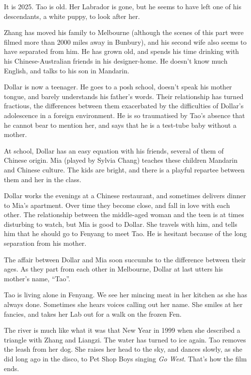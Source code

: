 \documentclass{article}
\begin{document}
It is 2025.  Tao is old.  Her Labrador is gone, but he seems to have
left one of his descendants, a white puppy, to look after her.

Zhang has moved his family to Melbourne (although the scenes of this
part were filmed more than 2000 miles away in Bunbury), and his second
wife also seems to have separated from him.  He has grown old, and
spends his time drinking with his Chinese-Australian friends in his
designer-home.  He doesn't know much English, and talks to his son in
Mandarin.

Dollar is now a teenager.  He goes to a posh school, doesn't speak his
mother tongue, and barely understands his father's words.  Their
relationship has turned fractious, the differences between them
exacerbated by the difficulties of Dollar's adolescence in a foreign
environment.  He is so traumatised by Tao's absence that he cannot
bear to mention her, and says that he is a test-tube baby without a
mother.

At school, Dollar has an easy equation with his friends, several of
them of Chinese origin.  Mia (played by Sylvia Chang) teaches these
children Mandarin and Chinese culture.  The kids are bright, and there
is a playful repartee between them and her in the class.

Dollar works the evenings at a Chinese restaurant, and sometimes
delivers dinner to Mia's apartment.  Over time they become close, and
fall in love with each other.  The relationship between the
middle-aged woman and the teen is at times disturbing to watch, but
Mia is good to Dollar.  She travels with him, and tells him that he
should go to Fenyang to meet Tao.  He is hesitant because of the long
separation from his mother.

The affair between Dollar and Mia soon succumbs to the difference
between their ages.  As they part from each other in Melbourne, Dollar
at last utters his mother's name, ``Tao''.

Tao is living alone in Fenyang.  We see her mincing meat in her
kitchen as she has always done.  Sometimes she hears voices calling
out her name.  She smiles at her fancies, and takes her Lab out for a
walk on the frozen Fen.

The river is much like what it was that New Year in 1999 when she
described a triangle with Zhang and Liangzi.  The water has turned to
ice again.  Tao removes the leash from her dog.  She raises her head
to the sky, and dances slowly, as she did long ago in the disco, to
Pet Shop Boys singing \emph{Go West}.  That's how the film ends.
\end{document}
